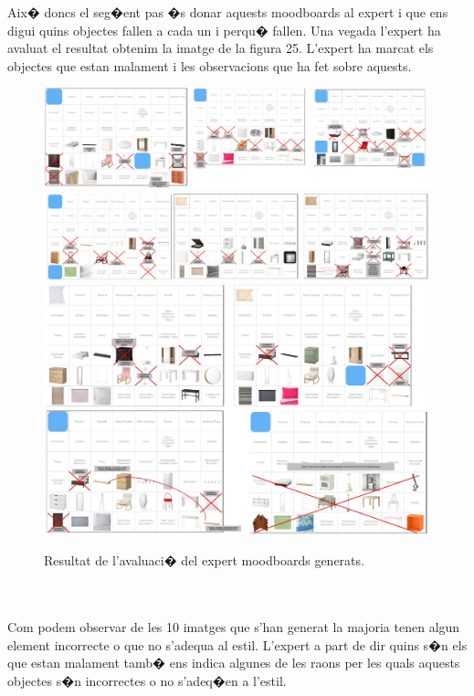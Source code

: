 \documentclass[12pt,a4paper,openright,oneside]{article}
\numberwithin{equation}{section}
\theoremstyle{definition}
\begin{document}
Aix� doncs el seg�ent pas �s donar aquests moodboards al expert i que ens digui quins objectes fallen a cada un i perqu� fallen. Una vegada l'expert ha avaluat el resultat obtenim la imatge de la figura 25. L'expert ha marcat els objectes que estan malament i les observacions que ha fet sobre aquests.
\begin{figure}[h!]
\begin{center}
\includegraphics[width=\textwidth,height=\textheight,keepaspectratio]{avaluation}
\includegraphics[width=\textwidth,height=\textheight,keepaspectratio]{avaluation1}
\includegraphics[width=\textwidth,height=\textheight,keepaspectratio]{avaluation2}
\caption{Resultat de l'avaluaci� del expert moodboards generats.}
\end{center}
\end{figure}
\\\\
Com podem observar de les 10 imatges que s'han generat la majoria tenen algun element incorrecte o que no s'adequa al estil. L'expert a part de dir quins s�n els que estan malament tamb� ens indica algunes de les raons per les quals aquests objectes s�n incorrectes o no s'adeq�en a l'estil. \\\\
\end{document}
